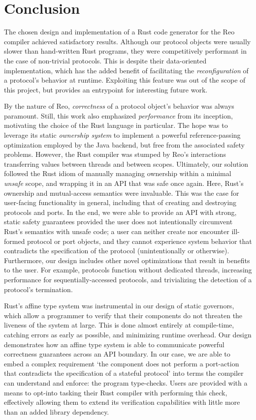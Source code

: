 \section{Conclusion}

The chosen design and implementation of a Rust code generator for the Reo compiler achieved satisfactory results. Although our protocol objects were usually slower than hand-written Rust programs, they were competitively performant in the case of non-trivial protocols. This is despite their data-oriented implementation, which has the added benefit of facilitating the \textit{reconfiguration} of a protocol's behavior at runtime. Exploiting this feature was out of the scope of this project, but provides an entrypoint for interesting future work.

By the nature of Reo, \textit{correctness} of a protocol object's behavior was always paramount. Still, this work also emphasized \textit{performance} from its inception, motivating the choice of the Rust language in particular. The hope was to leverage its static \textit{ownership system} to implement a powerful reference-passing optimization employed by the Java backend, but free from the associated safety problems. However, the Rust compiler was stumped by Reo's interactions transferring values between threads and between scopes. Ultimately, our solution followed the Rust idiom of manually managing ownership within a minimal \textit{unsafe} scope, and wrapping it in an API that was safe once again. Here, Rust's ownership and mutual-access semantics were invaluable. This was the case for user-facing functionality in general, including that of creating and destroying protocols and ports. In the end, we were able to provide an API with strong, static safety guarantees provided the user does not intentionally circumvent Rust's semantics with unsafe code; a user can neither create nor encounter ill-formed protocol or port objects, and they cannot experience system behavior that contradicts the specification of the protocol (unintentionally or otherwise). Furthermore, our design includes other novel optimizations that result in benefits to the user. For example, protocols function without dedicated threads, increasing performance for sequentially-accessed protocols, and trivializing the detection of a protocol's termination.

Rust's affine type system was instrumental in our design of static governors, which allow a programmer to verify that their components do not threaten the liveness of the system at large. This is done almost entirely at compile-time, catching errors as early as possible, and minimizing runtime overhead. Our design demonstrates how an affine type system is able to communicate powerful correctness guarantees across an API boundary. In our case, we are able to embed a complex requirement `the component does not perform a port-action that contradicts the specification of a stateful protocol' into terms the compiler can understand and enforce: the program type-checks. Users are provided with a means to opt-into tasking their Rust compiler with performing this check, effectively allowing them to extend its verification capabilities with little more than an added library dependency. 


